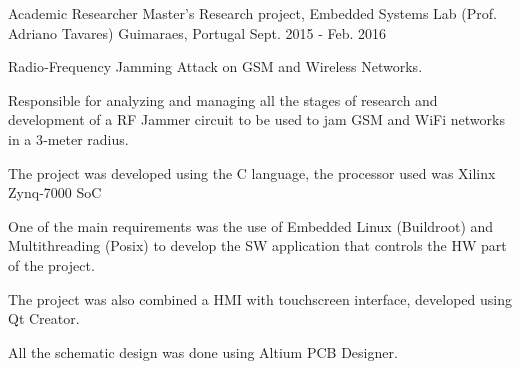 \begin{cventries}
  \cventry
    {Academic Researcher} %
    {Master’s Research project, Embedded Systems Lab (Prof. Adriano Tavares)} %
    {Guimaraes, Portugal} %
    {Sept. 2015 - Feb. 2016} %
    {
      \begin{cvitems} %
        \item {Radio‑Frequency Jamming Attack on GSM and Wireless Networks.}
        \item {Responsible for analyzing and managing all the stages of research and development of a RF Jammer circuit to be used to jam GSM and WiFi networks in a 3‑meter radius.}
        \item {The project was developed using the C language, the processor used was Xilinx Zynq‑7000 SoC}
        \item {One of the main requirements was the use of Embedded Linux (Buildroot) and Multithreading (Posix) to develop the SW application that controls the HW part of the project.}
        \item {The project was also combined a HMI with touchscreen interface, developed using Qt Creator.}
        \item {All the schematic design was done using Altium PCB Designer.}
      \end{cvitems}
    }
\end{cventries}
